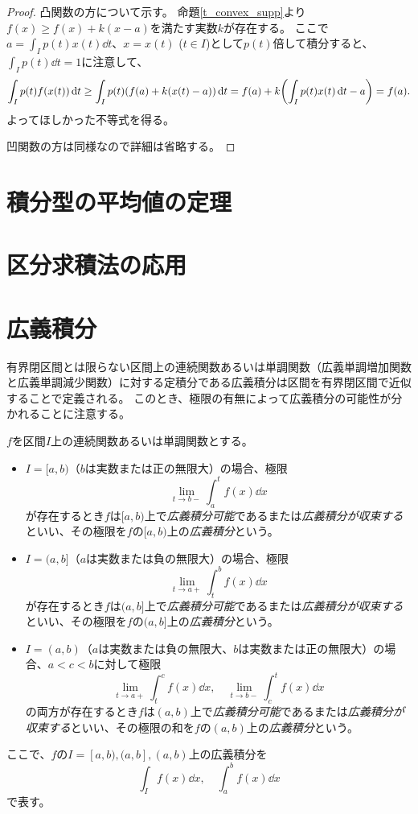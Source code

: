 \begin{proof}
凸関数の方について示す。
命題\ref{t_convex_supp}より$f(x) \ge f(x)+k(x-a)$を満たす実数$k$が存在する。
ここで$a = \int_I p(t)x(t)\dd{t}$、$x = x(t)$ ($t \in I$)として$p(t)$倍して積分すると、$\int_I p(t)\dd{t} = 1$に注意して、
$$
\int_I p(t)f(x(t))\dd{t} \ge \int_I p(t)(f(a)+k(x(t)-a))\dd{t} = f(a)+k\qty(\int_I p(t)x(t)\dd{t}-a) = f(a).
$$
よってほしかった不等式を得る。

凹関数の方は同様なので詳細は省略する。
\end{proof}

\section{積分型の平均値の定理}

\section{区分求積法の応用}

\section{広義積分}

有界閉区間とは限らない区間上の連続関数あるいは単調関数（広義単調増加関数と広義単調減少関数）に対する定積分である広義積分は区間を有界閉区間で近似することで定義される。
このとき、極限の有無によって広義積分の可能性が分かれることに注意する。

\begin{definition}[広義積分]
$f$を区間$I$上の連続関数あるいは単調関数とする。
\begin{itemize}
\item
$I = [a, b)$（$b$は実数または正の無限大）の場合、極限
$$
\lim_{t \to b-}\int_a^t f(x)\dd{x}
$$
が存在するとき$f$は$[a, b)$上で\emph{広義積分可能}であるまたは\emph{広義積分が収束する}といい、その極限を$f$の$[a, b)$上の\emph{広義積分}という。
\item
$I = (a, b]$（$a$は実数または負の無限大）の場合、極限
$$
\lim_{t \to a+}\int_t^b f(x)\dd{x}
$$
が存在するとき$f$は$(a, b]$上で\emph{広義積分可能}であるまたは\emph{広義積分が収束する}といい、その極限を$f$の$(a, b]$上の\emph{広義積分}という。
\item
$I = (a, b)$（$a$は実数または負の無限大、$b$は実数または正の無限大）の場合、$a < c < b$に対して極限
$$
\lim_{t \to a+}\int_t^c f(x)\dd{x}, \quad \lim_{t \to b-}\int_c^t f(x)\dd{x} 
$$
の両方が存在するとき$f$は$(a, b)$上で\emph{広義積分可能}であるまたは\emph{広義積分が収束する}といい、その極限の和を$f$の$(a, b)$上の\emph{広義積分}という。
\end{itemize}
ここで、$f$の$I = [a, b), (a, b], (a, b)$上の広義積分を
$$
\int_I f(x)\dd{x},
\quad \int_a^b f(x)\dd{x}
$$
で表す。
\end{definition}

